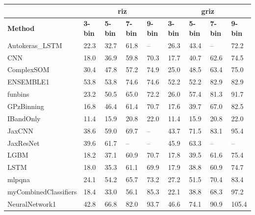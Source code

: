 \documentclass[twocolumn,twocolappendix]{aastex63}
\begin{document}
\begin{table}[]
\begin{tabular}{|l|llll|llll|}
                & \multicolumn{4}{c|}{\textbf{riz}}      & \multicolumn{4}{c|}{\textbf{griz}}                                \\ \hline
\textbf{Method} & \textbf{3-bin} & \textbf{5-bin} & \textbf{7-bin} & \textbf{9-bin} & \textbf{3-bin} & \textbf{5-bin} & \textbf{7-bin} & \textbf{9-bin} \\ \hline
{\sc Autokeras\_LSTM } & 22.3 & 32.7    & 61.8    & --    & 26.3             & 43.4             & --             & 72.2\\
{\sc CNN } & 18.0 & 36.9    & 59.8    & 70.3    & 17.7             & 40.7             & 62.6             & 74.5\\
{\sc ComplexSOM } & 30.4 & 47.8    & 57.2    & 74.9    & 25.0             & 48.5             & 63.4             & 75.0\\
{\sc ENSEMBLE1 } & 53.8 & 53.8    & 74.6    & 74.6    & 52.2             & 52.2             & 82.9             & 82.9\\
{\sc funbins } & 23.2 & 50.5    & 65.0    & 72.2    & 26.0             & 57.4             & 81.3             & 91.7\\
{\sc GPzBinning } & 16.8 & 46.4    & 61.4    & 70.7    & 17.6             & 39.7             & 67.0             & 82.5\\
{\sc IBandOnly } & 11.4 & 15.9    & 20.8    & 22.0    & 11.4             & 15.9             & 20.8             & 22.0\\
{\sc JaxCNN } & 38.6 & 59.0    & 69.7    & --    & 43.7             & 71.5             & 83.1             & 95.4\\
{\sc JaxResNet } & 39.6 & 61.7    & --    & --    & 45.9             & 63.3             & --             & --\\
{\sc LGBM } & 18.2 & 37.1    & 60.9    & 70.7    & 17.8             & 39.5             & 61.6             & 75.4\\
{\sc LSTM } & 18.0 & 35.3    & 61.1    & 69.9    & 17.9             & 38.8             & 60.9             & 74.7\\
{\sc mlpqna } & 24.1 & 54.2    & 65.7    & 73.2    & 27.2             & 51.5             & 70.4             & 83.4\\
{\sc myCombinedClassifiers } & 18.4 & 33.0    & 56.1    & 85.3    & 22.1             & 38.8             & 68.3             & 97.2\\
{\sc NeuralNetwork1 } & 42.8 & 66.8    & 82.0    & 93.7    & 46.6             & 74.1             & 90.9             & 105.4\\

\end{tabular}
\end{table}
\end{document}
